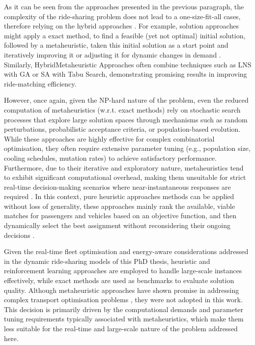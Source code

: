 As it can be seen from the approaches presented in the previous paragraph, the complexity of the ride-sharing problem does not lead to a one-size-fit-all cases, therefore relying on the hybrid approaches \cite{zargayouna2012fleet178}. For example, solution approaches might apply a exact method, to find a feasible (yet not optimal) initial solution, followed by a metaheuristic, taken this initial solution as a start point and iteratively improving it or adjusting it for dynamic changes in demand \cite{zargayouna2012fleet178}. Similarly, HybridMetaheuristic Approaches often combine techniques such as LNS with GA or SA with Tabu Search, demonstrating promising results in improving ride-matching efficiency. 

However, once again, given the NP-hard nature of the problem, even the reduced computation of metaheuristics (w.r.t. exact methods) rely on stochastic search processes that explore large solution spaces through mechanisms such as random perturbations, probabilistic acceptance criteria, or population-based evolution. While these approaches are highly effective for complex combinatorial optimisation, they often require extensive parameter tuning (e.g., population size, cooling schedules, mutation rates) to achieve satisfactory performance. Furthermore, due to their iterative and exploratory nature, metaheuristics tend to exhibit significant computational overhead, making them unsuitable for strict real-time decision-making scenarios where near-instantaneous responses are required \cite{talbi2009metaheuristics, gendreau2010handbook}. In this context, pure heuristic approaches methods can be applied without loss of generality, these approaches mainly rank the available, viable matches for passengers and vehicles based on an objective function, and then dynamically select the best assignment without reconsidering their ongoing decisions \cite{stiglic2016making162, ma2013tshare118, goel2017optimal68, ota2017stars135, qian2017optimal143, dorey2014ridesharing53, hyland2018sharing87}.

Given the real-time fleet optimisation and energy-aware considerations addressed in the dynamic ride-sharing models of this PhD thesis, heuristic and reinforcement learning approaches are employed to handle large-scale instances effectively, while exact methods are used as benchmarks to evaluate solution quality. Although metaheuristic approaches have shown promise in addressing complex transport optimisation problems \cite{gendreau2010handbook, talbi2009metaheuristics}, they were not adopted in this work. This decision is primarily driven by the computational demands and parameter tuning requirements typically associated with metaheuristics, which make them less suitable for the real-time and large-scale nature of the problem addressed here.

